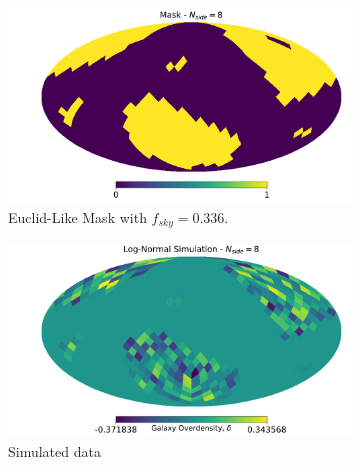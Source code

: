 \begin{figure}
\begin{subfigure}[b]{.5\textwidth}
 \includegraphics[scale=0.33]{BPL-FIGS/Flask-Euclid-lowEll-N8_mask.pdf}
  \caption{Euclid-Like Mask with $f_{sky} = 0.336 $.}
  \label{fig:BPL:LN-Euclid-N8-mask}
\end{subfigure}
\begin{subfigure}[b]{.5\textwidth}
 \includegraphics[scale=0.34]{BPL-FIGS/Flask-Euclid-lowEll-N8_map.pdf}
  \caption{Simulated data}
  \label{fig:BPL:LN-Euclid-N8-dens}
\end{subfigure}\\
\begin{subfigure}[b]{\textwidth}

\end{subfigure}
\end{figure}
